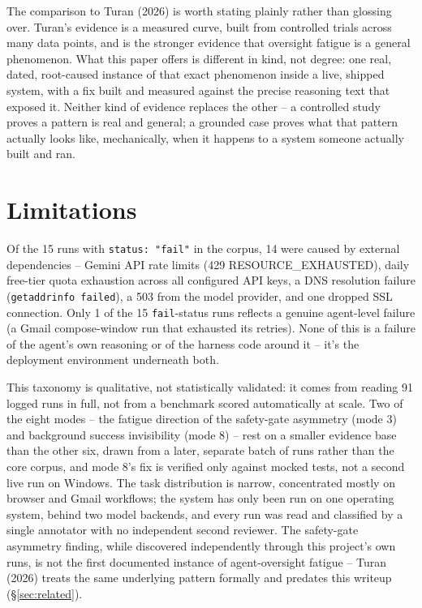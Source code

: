 \documentclass[11pt]{article}
\begin{document}
The comparison to Turan (2026) is worth stating plainly rather than glossing over. Turan's evidence is a measured curve, built from controlled trials across many data points, and is the stronger evidence that oversight fatigue is a general phenomenon. What this paper offers is different in kind, not degree: one real, dated, root-caused instance of that exact phenomenon inside a live, shipped system, with a fix built and measured against the precise reasoning text that exposed it. Neither kind of evidence replaces the other -- a controlled study proves a pattern is real and general; a grounded case proves what that pattern actually looks like, mechanically, when it happens to a system someone actually built and ran.
\section{Limitations}
\label{sec:limitations}
\begin{datanote}
Of the 15 runs with \texttt{status: "fail"} in the corpus, 14 were caused by external dependencies -- Gemini API rate limits (429 RESOURCE\_EXHAUSTED), daily free-tier quota exhaustion across all configured API keys, a DNS resolution failure (\texttt{getaddrinfo failed}), a 503 from the model provider, and one dropped SSL connection. Only 1 of the 15 \texttt{fail}-status runs reflects a genuine agent-level failure (a Gmail compose-window run that exhausted its retries). None of this is a failure of the agent's own reasoning or of the harness code around it -- it's the deployment environment underneath both.
\end{datanote}
This taxonomy is qualitative, not statistically validated: it comes from reading 91 logged runs in full, not from a benchmark scored automatically at scale. Two of the eight modes -- the fatigue direction of the safety-gate asymmetry (mode 3) and background success invisibility (mode 8) -- rest on a smaller evidence base than the other six, drawn from a later, separate batch of runs rather than the core corpus, and mode 8's fix is verified only against mocked tests, not a second live run on Windows. The task distribution is narrow, concentrated mostly on browser and Gmail workflows; the system has only been run on one operating system, behind two model backends, and every run was read and classified by a single annotator with no independent second reviewer. The safety-gate asymmetry finding, while discovered independently through this project's own runs, is not the first documented instance of agent-oversight fatigue -- Turan (2026) treats the same underlying pattern formally and predates this writeup (\S\ref{sec:related}).
\end{document}
